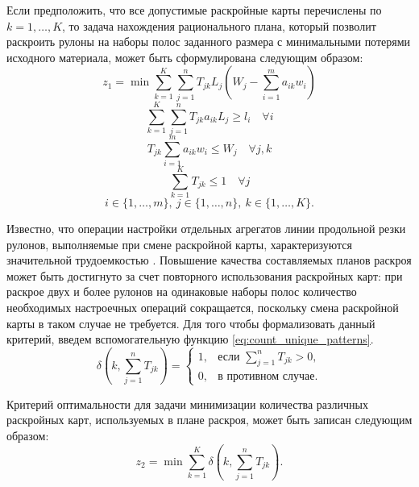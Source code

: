 \documentclass[12pt]{article}
\begin{document}
Если предположить, что все допустимые раскройные карты перечислены по 
$k=1,\ldots,K$, то задача нахождения рационального плана, который позволит 
раскроить рулоны на наборы полос заданного размера с минимальными потерями 
исходного материала, может быть сформулирована следующим образом:
\begin{equation}\label{eq:min_trim_loss}
    z_1=\min{\sum_{k=1}^{K} \sum_{j=1}^{n} T_{jk} L_j 
        \left(W_j-\sum_{i=1}^{m} a_{ik}w_i\right)}
\end{equation}
\begin{equation}\label{eq:orders_are_meet}
     \sum_{k=1}^{K} \sum_{j=1}^{n} T_{jk} a_{ik} L_j \geq l_i \quad \forall i
\end{equation}
\begin{equation}\label{eq:pattern_feasible}
     T_{jk} \sum_{i=1}^{m} a_{ik} w_i \leq W_j \quad \forall j,k
\end{equation}
\begin{equation}\label{eq:rolls_cut_once}
     \sum_{k=1}^{K} T_{jk} \leq 1 \quad \forall j
\end{equation}
\[ i \in \{1,\ldots,m\}, \: j \in \{1,\ldots,n\}, \: k \in \{1,\ldots,K\}.\]

Известно, что операции настройки отдельных агрегатов линии продольной резки 
рулонов, выполняемые при смене раскройной карты, характеризуются значительной 
трудоемкостью \cite{haessler88, song06}. Повышение качества составляемых планов раскроя может 
быть достигнуто за счет повторного использования раскройных карт: при раскрое 
двух и более рулонов на одинаковые наборы полос количество необходимых 
настроечных операций сокращается, поскольку смена раскройной карты в таком 
случае не требуется. Для того чтобы формализовать данный критерий, введем 
вспомогательную функцию 
\eqref{eq:count_unique_patterns}.
\begin{equation}\label{eq:count_unique_patterns}
    \delta\left(k, \sum_{j=1}^{n} T_{jk}\right)=
        \begin{cases}
            1, & \text{если } \sum_{j=1}^{n} T_{jk}>0, \\
            0, & \text{в противном случае}.
        \end{cases}    
\end{equation}

Критерий оптимальности для задачи минимизации количества различных раскройных 
карт, используемых в плане раскроя, может быть записан следующим образом:
\begin{equation}\label{eq:min_patterns}
    z_2=\min{\sum_{k=1}^{K}} \delta\left(k, \sum_{j=1}^{n} T_{jk}\right).
\end{equation}
\end{document}
